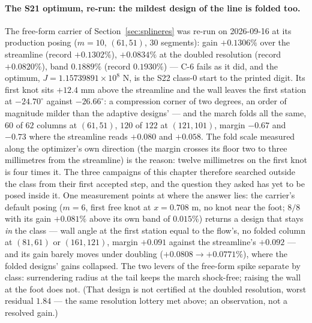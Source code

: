 \paragraph{The S21 optimum, re-run: the mildest design of the line is
folded too.} The free-form carrier of Section~\ref{sec:splineres} was
re-run on 2026-09-16 at its production posing ($m = 10$, $(61,51)$,
30 segments): gain $+0.1306\%$ over the streamline (record
$+0.1302\%$), $+0.0834\%$ at the doubled resolution (record
$+0.0820\%$), band $0.1889\%$ (record $0.1930\%$) --- C-6 fails as it
did, and the optimum, $J = 1.15739891\times10^{8}$ N, is the S22
class-0 start to the printed digit. Its first knot sits $+12.4$ mm
above the streamline and the wall leaves the first station at
$-24.70^\circ$ against $-26.66^\circ$: a compression corner of two
degrees, an order of magnitude milder than the adaptive designs'
--- and the march folds all the same, $60$ of $62$ columns at
$(61,51)$, $120$ of $122$ at $(121,101)$, margin $-0.67$ and $-0.73$
where the streamline reads $+0.080$ and $+0.058$. The fold scale
measured along the optimizer's own direction (the margin crosses
its floor two to three millimetres from the streamline) is the
reason: twelve millimetres on the first knot is four times it. The
three campaigns of this chapter therefore searched outside the class
from their first accepted step, and the question they asked has yet
to be posed inside it. One measurement points at where the answer
lies: the carrier's default posing ($m = 6$, first free knot at
$x = 0.708$ m, no knot near the foot; $8/8$ with its gain $+0.081\%$
above its own band of $0.015\%$) returns a design that stays
\emph{in} the class --- wall angle at the first station equal to
the flow's, no folded column at $(81,61)$ or $(161,121)$, margin
$+0.091$ against the streamline's $+0.092$ --- and its gain barely
moves under doubling ($+0.0808 \to +0.0771\%$), where the folded
designs' gains collapsed. The two levers of the free-form spike
separate by class: surrendering radius at the tail keeps the march
shock-free; raising the wall at the foot does not. (That design is
not certified at the doubled resolution, worst residual $1.84$ ---
the same resolution lottery met above; an observation, not a
resolved gain.)

